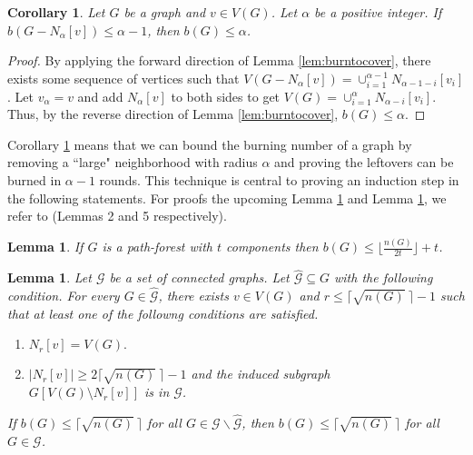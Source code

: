 \documentclass[12pt]{article}
\newtheorem{lemma}[theorem]{Lemma}
\newtheorem{corollary}[theorem]{Corollary}
\begin{document}
\begin{corollary} \label{cor:leftovers}
    Let $G$ be a graph and $v \in V(G)$.
    Let $\alpha$ be a positive integer.
    If $b(G - N_\alpha[v]) \leq \alpha - 1$, then $b(G) \leq \alpha$.
\end{corollary}
\begin{proof}
    By applying the forward direction of Lemma \ref{lem:burntocover}, there exists some sequence of vertices such that $V(G-N_\alpha[v]) = \cup_{i=1}^{\alpha-1} N_{\alpha-1-i}[v_i]$.
    Let $v_\alpha = v$ and add $N_{\alpha}[v]$ to both sides to get $V(G) = \cup_{i=1}^\alpha N_{\alpha - i}[v_i]$.
    Thus, by the reverse direction of Lemma \ref{lem:burntocover}, $b(G) \leq \alpha$.
\end{proof}

Corollary \ref{cor:leftovers} means that we can bound the burning number of a graph by removing a ``large" neighborhood with radius $\alpha$ and proving the leftovers can be burned in $\alpha - 1$ rounds.
This technique is central to proving an induction step in the following statements.
For proofs the upcoming Lemma \ref{lem:path_forest} and Lemma \ref{lem:family}, we refer to \cite{burning_spiders} (Lemmas 2 and 5 respectively).

\begin{lemma} \label{lem:path_forest}
    If $G$ is a path-forest with $t$ components then $b(G) \leq \lfloor \frac{n(G)}{2t} \rfloor + t$.
\end{lemma}

\begin{lemma} \label{lem:family}
    Let $\mathcal{G}$ be a set of connected graphs.
    Let $\hat{\mathcal{G}} \subseteq G$ with the following condition.
    For every $G \in \hat{\mathcal{G}}$, there exists $v \in V(G)$ and $r \leq \lceil \sqrt{n(G)}\ \rceil - 1$ such that at least one of the followng conditions are satisfied.
    \begin{enumerate}
        \item $N_r[v] = V(G).$
        \item $|N_r[v]| \geq 2\lceil \sqrt{n(G)}\ \rceil - 1$ and the induced subgraph\\ $G[V(G) \setminus N_r[v]]$ is in  $\mathcal{G}$.
    \end{enumerate}
    If $b(G) \leq \lceil \sqrt{n(G)}\ \rceil$ for all $G \in \mathcal{G} \backslash \hat{\mathcal{G}}$, then $b(G) \leq \lceil \sqrt{n(G)}\ \rceil$ for all $G \in \mathcal{G}$.
\end{lemma}
\end{document}
